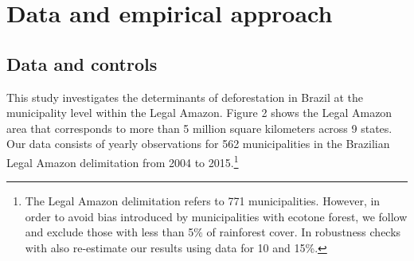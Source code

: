 

\section{Data and empirical approach}
\label{S:3}





\subsection{Data and controls}



This study investigates the determinants of deforestation in Brazil at the municipality level within the Legal Amazon. Figure 2 shows the Legal Amazon area that corresponds to more than 5 million square kilometers across 9 states. Our data consists of yearly observations for 562 municipalities in the Brazilian Legal Amazon delimitation from 2004 to 2015.\footnote{The Legal Amazon delimitation refers to 771 municipalities. However, in order to avoid bias introduced by municipalities with ecotone forest, we follow \citet{hargrave_kis-katos_2012} and exclude those with less than 5$\%$ of rainforest cover.  In robustness checks with also re-estimate our results using data for 10 and 15\%.}

